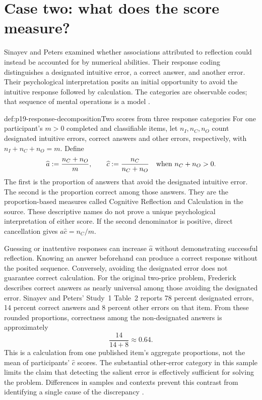 \section{Case two: what does the score measure?}
\label{sec:p19-measurement-case}

Sinayev and Peters examined whether associations attributed to reflection could
instead be accounted for by numerical abilities. Their response coding
distinguishes a designated intuitive error, a correct answer, and another
error. Their psychological interpretation posits an initial opportunity to
avoid the intuitive response followed by calculation. The categories are
observable codes; that sequence of mental operations is a model
\cite[pp.~3--5, table~1]{SinayevPeters2015Calculation}.

\begin{hbdefinition}{def:p19-response-decomposition}{Two scores from three response categories}
For one participant's \(m>0\) completed and classifiable items, let
\(n_I,n_C,n_O\) count designated intuitive errors, correct answers and other
errors, respectively, with \(n_I+n_C+n_O=m\). Define
\[
 \widehat a\mathrel{:=}\frac{n_C+n_O}{m},\qquad
 \widehat c\mathrel{:=}\frac{n_C}{n_C+n_O}
                       \quad\text{when }n_C+n_O>0.
\]
The first is the proportion of answers that avoid the designated intuitive
error. The second is the proportion correct among those answers. They are
the proportion-based measures called Cognitive Reflection and Calculation
in the source. These descriptive names do not prove a unique psychological
interpretation of either score. If the second denominator is positive,
direct cancellation gives \(\widehat a\widehat c=n_C/m\).
\end{hbdefinition}

Guessing or inattentive responses can increase \(\widehat a\) without
demonstrating successful reflection. Knowing an answer beforehand can produce
a correct response without the posited sequence. Conversely, avoiding the
designated error does not guarantee correct calculation. For the original
two-price problem, Frederick describes correct answers as nearly universal
among those avoiding the designated error. Sinayev and Peters' Study~1
Table~2 reports 78 percent designated errors, 14 percent correct answers and
8 percent other errors on that item. From these rounded proportions, correctness
among the non-designated answers is approximately
\[
                    \frac{14}{14+8}\approx0.64.
\]
This is a calculation from one published item's aggregate proportions, not
the mean of participants' \(\widehat c\) scores. The substantial other-error
category in this sample limits the claim that detecting the salient error is
effectively sufficient for solving the problem. Differences in samples and
contexts prevent this contrast from identifying a single cause of the
discrepancy \cite[p.~27]{Frederick2005CRT}
\cite[pp.~5--7, table~2]{SinayevPeters2015Calculation}.

